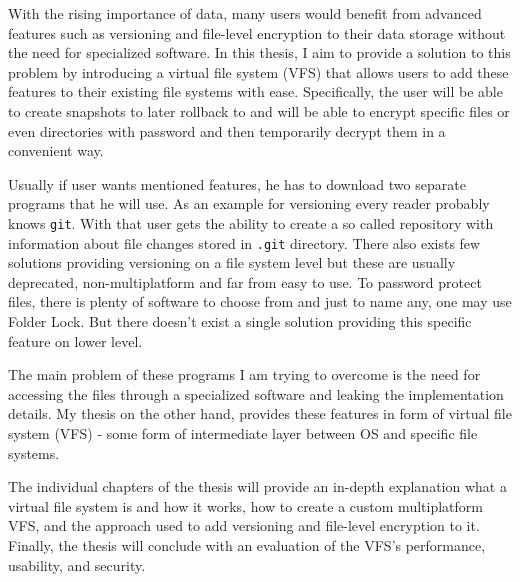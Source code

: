 

With the rising importance of data, many users would benefit from advanced features such as versioning and file-level encryption to their data storage without the need for specialized software.
In this thesis, I aim to provide a solution to this problem by introducing a virtual file system (VFS) that allows users to add these features to their existing file systems with ease.
Specifically, the user will be able to create snapshots to later rollback to and will be able to encrypt specific files or even directories with password and then temporarily decrypt them in a convenient way.

Usually if user wants mentioned features, he has to download two separate programs that he will use.
As an example for versioning every reader probably knows \texttt{git}.
With that user gets the ability to create a so called repository with information about file changes stored in \texttt{.git} directory. There also exists few solutions providing versioning on a file system level but these are usually deprecated, non-multiplatform and far from easy to use.
To password protect files, there is plenty of software to choose from and just to name any, one may use Folder Lock. But there doesn't exist a single solution providing this specific feature on lower level.

The main problem of these programs I am trying to overcome is the need for accessing the files through a specialized software and leaking the implementation details.
My thesis on the other hand, provides these features in form of virtual file system (VFS) - some form of intermediate layer between OS and specific file systems.

The individual chapters of the thesis will provide an in-depth explanation what a virtual file system is and how it works, how to create a custom multiplatform VFS, and the approach used to add versioning and file-level encryption to it. 
Finally, the thesis will conclude with an evaluation of the VFS's performance, usability, and security.